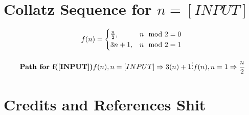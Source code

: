 \documentclass{article}
\begin{document}
\section{Collatz Sequence for \(n=[INPUT]\) }

\[
    f(n)=
    \begin{cases}
    \frac{n}{2}, & n \mod 2=0
    \\
    3n+1, &n \mod 2=1
    \end{cases} \\
\]

\[
    \textbf{Path for f([INPUT])}
    \\[3mm]

    
    f(n), n=[INPUT]
    \\
    \Rightarrow 3(n)+1
    \\[1mm]
    \vdots
    \\[1mm]
    f(n), n=1
    \\
    \Rightarrow \frac{n}{2}
\]

    
\section{Credits and References Shit}
\end{document}

